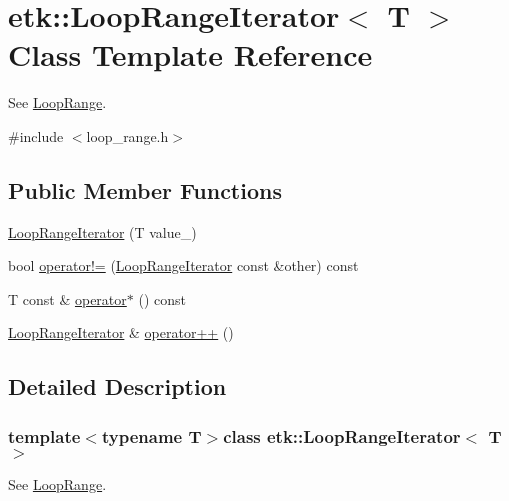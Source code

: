 \hypertarget{classetk_1_1_loop_range_iterator}{\section{etk\-:\-:Loop\-Range\-Iterator$<$ T $>$ Class Template Reference}
\label{classetk_1_1_loop_range_iterator}
}


See \hyperlink{classetk_1_1_loop_range}{Loop\-Range}.  




{\ttfamily \#include $<$loop\-\_\-range.\-h$>$}

\subsection*{Public Member Functions}
\begin{DoxyCompactItemize}
\item 
\hyperlink{classetk_1_1_loop_range_iterator_a6559a8dcd8ea01fe67b69e8716771ebc}{Loop\-Range\-Iterator} (T value\-\_\-)
\item 
bool \hyperlink{classetk_1_1_loop_range_iterator_add28a9e609904709987b8f8d88731b99}{operator!=} (\hyperlink{classetk_1_1_loop_range_iterator}{Loop\-Range\-Iterator} const \&other) const 
\item 
T const \& \hyperlink{classetk_1_1_loop_range_iterator_a9612432cc32c5cf1a201cf031d43b714}{operator$\ast$} () const 
\item 
\hyperlink{classetk_1_1_loop_range_iterator}{Loop\-Range\-Iterator} \& \hyperlink{classetk_1_1_loop_range_iterator_a71e1ca761e2f6abd5bb412e5065e8139}{operator++} ()
\end{DoxyCompactItemize}


\subsection{Detailed Description}
\subsubsection*{template$<$typename T$>$class etk\-::\-Loop\-Range\-Iterator$<$ T $>$}

See \hyperlink{classetk_1_1_loop_range}{Loop\-Range}. 

